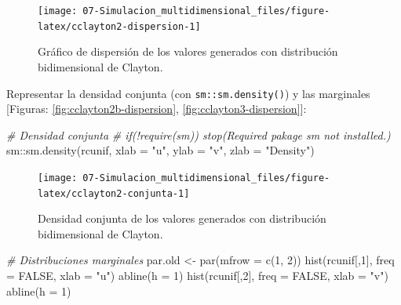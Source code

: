 \documentclass[
]{book}
\newenvironment{Shaded}{\begin{snugshade}}{\end{snugshade}}
\newcommand{\AttributeTok}[1]{\textcolor[rgb]{0.77,0.63,0.00}{#1}}
\newcommand{\CommentTok}[1]{\textcolor[rgb]{0.56,0.35,0.01}{\textit{#1}}}
\newcommand{\ConstantTok}[1]{\textcolor[rgb]{0.00,0.00,0.00}{#1}}
\newcommand{\DecValTok}[1]{\textcolor[rgb]{0.00,0.00,0.81}{#1}}
\newcommand{\FunctionTok}[1]{\textcolor[rgb]{0.00,0.00,0.00}{#1}}
\newcommand{\NormalTok}[1]{#1}
\newcommand{\OtherTok}[1]{\textcolor[rgb]{0.56,0.35,0.01}{#1}}
\newcommand{\SpecialCharTok}[1]{\textcolor[rgb]{0.00,0.00,0.00}{#1}}
\newcommand{\StringTok}[1]{\textcolor[rgb]{0.31,0.60,0.02}{#1}}
\theoremstyle{break}
\theoremstyle{definition}
\theoremstyle{definition}
\theoremstyle{definition}
\theoremstyle{definition}
\theoremstyle{remark}
\begin{document}
\begin{enumerate}
  \begin{figure}[!htb]

  {\centering \texttt{[image: 07-Simulacion\_multidimensional\_files/figure-latex/cclayton2-dispersion-1]} 

  }

  \caption{Gráfico de dispersión de los valores generados con distribución bidimensional de Clayton.}\label{fig:cclayton2-dispersion}
  \end{figure}

  Representar la densidad conjunta (con \texttt{sm::sm.density()}) y las marginales {[}Figuras: \ref{fig:cclayton2b-dispersion}, \ref{fig:cclayton3-dispersion}{]}:

\begin{Shaded}
\begin{Highlighting}[]
\CommentTok{\# Densidad conjunta}
\CommentTok{\# if(!require(sm)) stop(\textquotesingle{}Required pakage \textasciigrave{}sm\textasciigrave{} not installed.\textquotesingle{})}
\NormalTok{sm}\SpecialCharTok{::}\FunctionTok{sm.density}\NormalTok{(rcunif, }\AttributeTok{xlab =} \StringTok{"u"}\NormalTok{, }\AttributeTok{ylab =} \StringTok{"v"}\NormalTok{, }\AttributeTok{zlab =} \StringTok{"Density"}\NormalTok{)    }
\end{Highlighting}
\end{Shaded}

  \begin{figure}[!htb]

  {\centering \texttt{[image: 07-Simulacion\_multidimensional\_files/figure-latex/cclayton2-conjunta-1]} 

  }

  \caption{Densidad conjunta de los valores generados con distribución bidimensional de Clayton.}\label{fig:cclayton2-conjunta}
  \end{figure}

\begin{Shaded}
\begin{Highlighting}[]
\CommentTok{\# Distribuciones marginales}
\NormalTok{par.old }\OtherTok{\textless{}{-}} \FunctionTok{par}\NormalTok{(}\AttributeTok{mfrow =} \FunctionTok{c}\NormalTok{(}\DecValTok{1}\NormalTok{, }\DecValTok{2}\NormalTok{))}
\FunctionTok{hist}\NormalTok{(rcunif[,}\DecValTok{1}\NormalTok{], }\AttributeTok{freq =} \ConstantTok{FALSE}\NormalTok{, }\AttributeTok{xlab =} \StringTok{"u"}\NormalTok{)}
\FunctionTok{abline}\NormalTok{(}\AttributeTok{h =} \DecValTok{1}\NormalTok{)}
\FunctionTok{hist}\NormalTok{(rcunif[,}\DecValTok{2}\NormalTok{], }\AttributeTok{freq =} \ConstantTok{FALSE}\NormalTok{, }\AttributeTok{xlab =} \StringTok{"v"}\NormalTok{)}
\FunctionTok{abline}\NormalTok{(}\AttributeTok{h =} \DecValTok{1}\NormalTok{)}
\end{Highlighting}
\end{Shaded}


\end{enumerate}
\end{document}
